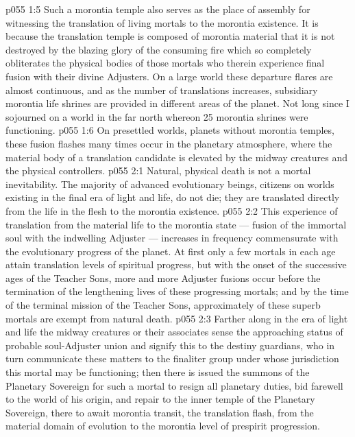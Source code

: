 \vs p055 1:5 Such a morontia temple also serves as the place of assembly for witnessing the translation of living mortals to the morontia existence. It is because the translation temple is composed of morontia material that it is not destroyed by the blazing glory of the consuming fire which so completely obliterates the physical bodies of those mortals who therein experience final fusion with their divine Adjusters. On a large world these departure flares are almost continuous, and as the number of translations increases, subsidiary morontia life shrines are provided in different areas of the planet. Not long since I sojourned on a world in the far north whereon 25 morontia shrines were functioning.
\vs p055 1:6 \pc On presettled worlds, planets without morontia temples, these fusion flashes many times occur in the planetary atmosphere, where the material body of a translation candidate is elevated by the midway creatures and the physical controllers.
\vs p055 2:1 Natural, physical death is not a mortal inevitability. The majority of advanced evolutionary beings, citizens on worlds existing in the final era of light and life, do not die; they are translated directly from the life in the flesh to the morontia existence.
\vs p055 2:2 This experience of translation from the material life to the morontia state --- fusion of the immortal soul with the indwelling Adjuster --- increases in frequency commensurate with the evolutionary progress of the planet. At first only a few mortals in each age attain translation levels of spiritual progress, but with the onset of the successive ages of the Teacher Sons, more and more Adjuster fusions occur before the termination of the lengthening lives of these progressing mortals; and by the time of the terminal mission of the Teacher Sons, approximately  of these superb mortals are exempt from natural death.
\vs p055 2:3 \pc Farther along in the era of light and life the midway creatures or their associates sense the approaching status of probable soul\hyp{}Adjuster union and signify this to the destiny guardians, who in turn communicate these matters to the finaliter group under whose jurisdiction this mortal may be functioning; then there is issued the summons of the Planetary Sovereign for such a mortal to resign all planetary duties, bid farewell to the world of his origin, and repair to the inner temple of the Planetary Sovereign, there to await morontia transit, the translation flash, from the material domain of evolution to the morontia level of prespirit progression.
